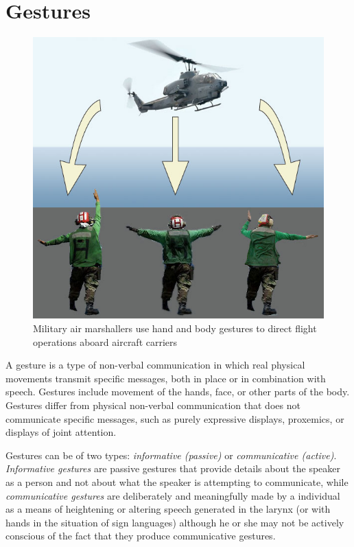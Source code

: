 \documentclass[12pt,a4paper,twoside]{report}
\begin{document}
\section{Gestures}

\begin{figure}
  \includegraphics[width=0.9\linewidth]{img/Gesture_navy.jpg}
  \caption[]{Military air marshallers use hand and body gestures to direct flight operations aboard aircraft carriers \footnotemark[3]}
  \label{fig:air_marshallers}
\end{figure}


A gesture is a type of non-verbal communication in which real physical movements transmit specific messages, both in place or in combination with speech. Gestures include movement of the hands, face, or other parts of the body. Gestures differ from physical non-verbal communication that does not communicate specific messages, such as purely expressive displays, proxemics, or displays of joint attention. \cite{Gestures}

Gestures can be of two types: \textit{informative (passive)} or \textit{communicative (active)}. \textit{Informative gestures} are passive gestures that provide details about the speaker as a person and not about what the speaker is attempting to communicate, while \textit{communicative gestures} are deliberately and meaningfully made by a individual as a means of heightening or altering speech generated in the larynx (or with hands in the situation of sign languages) although he or she may not be actively conscious of the fact that they produce communicative gestures.
\end{document}

